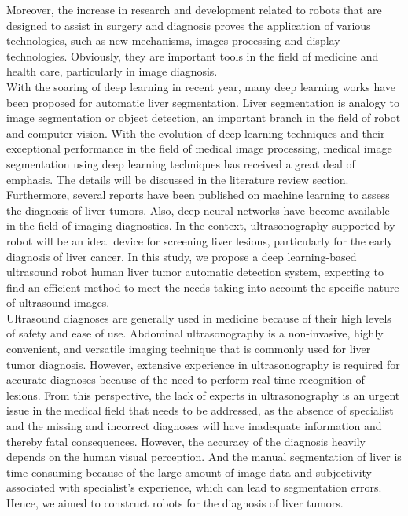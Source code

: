 \documentclass[12pt, a4paper]{article}
\begin{document}
\setlength{\parindent}{1em}
Moreover, the increase in research and development related to robots that are designed to assist in surgery and diagnosis proves the application of various technologies, such as new mechanisms, images processing and display technologies. Obviously, they are important tools in the field of medicine and health care, particularly in image diagnosis. \\

\setlength{\parindent}{1em}
With the soaring of deep learning in recent year, many deep learning works have been proposed for automatic liver segmentation\cite{r6,r7}. Liver segmentation is analogy to image segmentation or object detection, an important branch in the field of robot and computer vision. With the evolution of deep learning techniques and their exceptional performance in the field of medical image processing, medical image segmentation using deep learning techniques has received a great deal of emphasis. The details will be discussed in the literature review section.\\

\setlength{\parindent}{1em}
Furthermore, several reports have been published on machine learning to assess the diagnosis of liver tumors. Also, deep neural networks have become available in the field of imaging diagnostics. In the context, ultrasonography supported by robot will be an ideal device for screening liver lesions, particularly for the early diagnosis of liver cancer. In this study, we propose a deep learning-based ultrasound robot human liver tumor automatic detection system, expecting to find an efficient method to meet the needs taking into account the specific nature of ultrasound images.\\

\setlength{\parindent}{1em}
Ultrasound diagnoses are generally used in medicine because of their high levels of safety and ease of use\cite{r8}. Abdominal ultrasonography is a non-invasive, highly convenient, and versatile imaging technique that is commonly used for liver tumor diagnosis. However, extensive experience in ultrasonography is required for accurate diagnoses because of the need to perform real-time recognition of lesions. From this perspective, the lack of experts in ultrasonography is an urgent issue in the medical field that needs to be addressed, as the absence of specialist and the missing and incorrect diagnoses will have inadequate information and thereby fatal consequences. However, the accuracy of the diagnosis heavily depends on the human visual perception. And the manual segmentation of liver is time-consuming because of the large amount of image data and subjectivity associated with specialist’s experience, which can lead to segmentation errors. Hence, we aimed to construct robots for the diagnosis of liver tumors.\\
\end{document}
